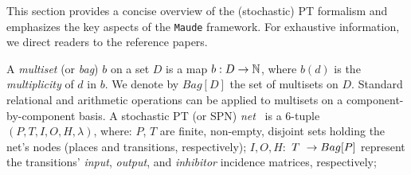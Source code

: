 
This section provides a concise overview of the (stochastic) PT formalism and emphasizes the key aspects of the 	\texttt{Maude} framework. For exhaustive information, we direct readers to the reference papers.

A \textit{multiset} (or \textit{bag}) $b$ on a set $D$ is a map $b: D \rightarrow \mathbb{N}$, where $b(d)$ is the \emph{multiplicity} of $d$ in $b$. We denote by $Bag[D]$ the set of multisets on $D$.
Standard relational and arithmetic operations can be applied to multisets on a component-by-component basis. 
%
A stochastic PT (or SPN) \emph{net}~\cite{ReisigPN,GSPN1993}
is a 6-tuple $(P,T,I,O,H,\lambda)$, where:
$P$, $T$ are finite, non-empty, disjoint sets holding the net's nodes (places and transitions, respectively);
$I,O,H:$ $T \ \rightarrow Bag[P]$ represent the transitions' \emph{input}, \emph{output}, and \emph{inhibitor} incidence matrices, respectively;
